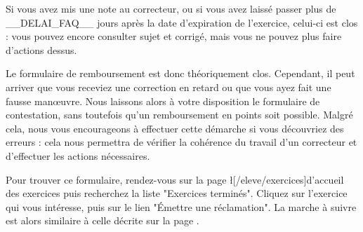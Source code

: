 ﻿Si vous avez mis une note au correcteur, ou si vous avez laissé passer plus de __DELAI_FAQ__ jours après la date d'expiration de l'exercice, celui-ci est clos : vous pouvez encore consulter sujet et corrigé, mais vous ne pouvez plus faire d'actions dessus.

Le formulaire de remboursement est donc théoriquement clos. Cependant, il peut arriver que vous receviez une correction en retard ou que vous ayez fait une fausse manœuvre. Nous laissons alors à votre disposition le formulaire de contestation, sans toutefois qu'un remboursement en points soit possible.
Malgré cela, nous vous encourageons à effectuer cette démarche si vous découvriez des erreurs : cela nous permettra de vérifier la cohérence du travail d'un correcteur et d'effectuer les actions nécessaires.

Pour trouver ce formulaire, rendez-vous sur la page \l[/eleve/exercices]{d'accueil des exercices} puis recherchez la liste "Exercices terminés".
Cliquez sur l'exercice qui vous intéresse, puis sur le lien "Émettre une réclamation".
La marche à suivre est alors similaire à celle décrite sur la page .